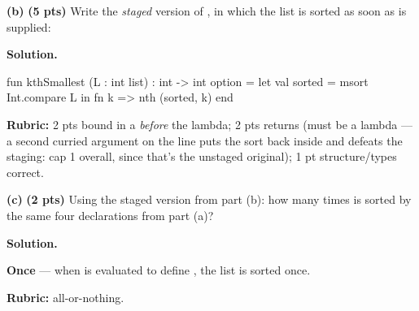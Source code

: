 \documentclass[crop=false]{standalone}
\newif\ifsol
\newenvironment{solution}
    {\par\color{solution_color}\begin{framed}\textbf{Solution.}\par}
    {\end{framed}}
\newcommand{\quizproblem}[3]{%
  \needspace{5\baselineskip}%
  \stepcounter{problem}%
  \ifsol
    \subsection*{\parbox[t]{0.70\linewidth}{\raggedright Problem \arabic{problem}. #1}\hfill \timing{#2} \quad (#3 pts)}%
  \else
    \subsection*{\parbox[t]{0.82\linewidth}{\raggedright Problem \arabic{problem}. #1}\hfill (#3 pts)}%
  \fi
}
\newcommand{\subpts}[1]{\textbf{(#1 pts)}}
\newcommand{\answerspace}[1]{\ifsol\else\vspace{#1}\par\fi}
\begin{document}
\vspace{0.5em}

\textbf{(b)} \subpts{5} Write the \emph{staged} version of ,
in which the list is sorted as soon as  is supplied:

\answerspace{10cm}

\begin{solution}
\begin{codeblock}
  fun kthSmallest (L : int list) : int -> int option =
    let
      val sorted = msort Int.compare L
    in
      fn k => nth (sorted, k)
    end
\end{codeblock}

\textbf{Rubric:} 2 pts  bound in a 
\emph{before} the lambda; 2 pts returns 
(must be a lambda --- a second curried argument on the  line
puts the sort back inside and defeats the staging: cap 1 overall, since
that's the unstaged original); 1 pt structure/types correct.
\end{solution}

\vspace{0.5em}

\textbf{(c)} \subpts{2} Using the staged version from part (b): how
many times is  sorted by the same four declarations from
part (a)?

\answerspace{2cm}

\begin{solution}
\textbf{Once} --- when  is evaluated to define
, the list is sorted once.

\textbf{Rubric:} all-or-nothing.
\end{solution}





\end{document}
